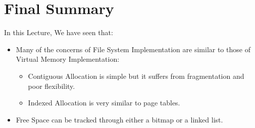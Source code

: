 \documentclass[openright, twoside]{report}
\theoremstyle{definition}
\theoremstyle{example}
\begin{document}
\section{Final Summary}
In this Lecture, We have seen that:

\begin{itemize}
	\item Many of the concerns of File System Implementation are similar to those 
	of Virtual Memory Implementation:
	\begin{itemize}
		\item Contiguous Allocation is simple but it suffers from fragmentation and 
		poor flexibility.
		\item Indexed Allocation is very similar to page tables.
	\end{itemize}
	\item Free Space can be tracked through either a bitmap or a linked list.
\end{itemize}
\end{document}
